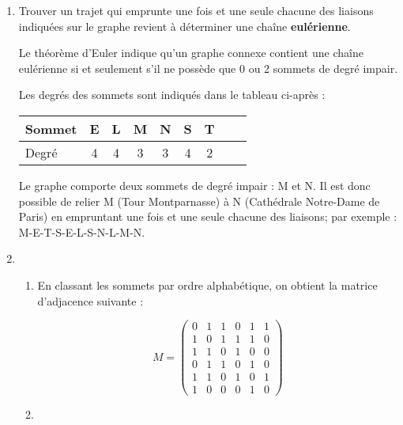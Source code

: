 \begin{corrige}
     \begin{enumerate}
          \item %
          Trouver un trajet qui emprunte une fois et une seule chacune des liaisons indiquées sur le graphe revient à déterminer une chaîne \textbf{eulérienne}.
          \par
          Le théorème d'Euler indique qu'un graphe connexe contient une chaîne eulérienne si et seulement s'il ne possède que 0 ou 2 sommets de degré impair.
          \par
          Les degrés des sommets sont indiqués dans le tableau ci-après :
          \par
          \begin{center}
               \begin{tabular}{|l|c|c|c|c|c|c|c|c|} %
                    \hline
                    Sommet & E & L & M & N & S & T  \\
                    \hline
                    Degré & 4 & 4 & 3 & 3 & 4 & 2 \\
                    \hline
               \end{tabular}
          \end{center}
          \par
          Le graphe comporte deux sommets de degré impair : M et N. Il est donc possible de relier M (Tour Montparnasse) à N (Cathédrale Notre-Dame de Paris) en empruntant une fois et une seule chacune des liaisons; par exemple : M-E-T-S-E-L-S-N-L-M-N.
          \item %
          \begin{enumerate}[label=\alph*.]
               \item %
               En classant les sommets par ordre alphabétique, on obtient la matrice d'adjacence suivante :
               \par
               \[ M = \begin{pmatrix}
                    0 &1 &1 &0 &1 &1 \\
                    1 &0 &1 &1 &1 &0 \\
                    1 &1 &0 &1 &0 &0 \\
                    0 &1 &1 &0 &1 &0 \\
                    1 &1 &0 &1 &0 &1\\
               1 &0 &0 &0 &1 &0  \end{pmatrix}
               \]
               \item %

\end{enumerate}
\end{enumerate}
\end{corrige}
